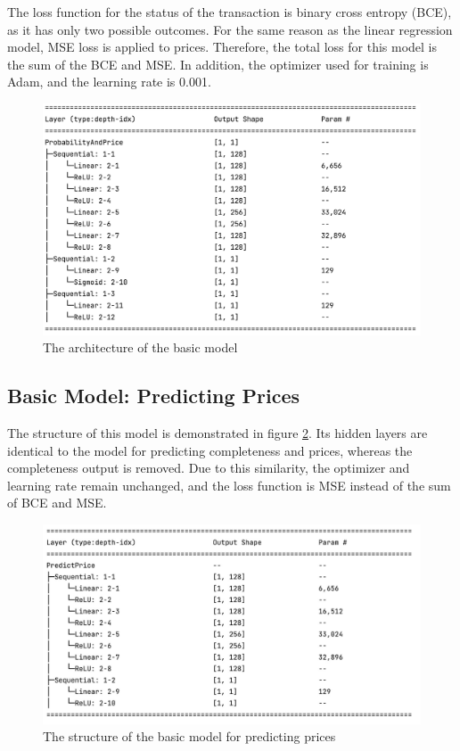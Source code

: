 \documentclass[12pt,twoside]{report}
\begin{document}
The loss function for the status of the transaction is binary cross entropy (BCE), as it has only two possible outcomes. For the same reason as the linear regression model, MSE loss is applied to prices. Therefore, the total loss for this model is the sum of the BCE and MSE. In addition, the optimizer used for training is Adam, and the learning rate is 0.001. 
\\ 

\begin{figure}[h]
	\centering
	\includegraphics[width=1\linewidth]{basic_model_layout}
	\caption{The architecture of the basic model}
	\label{basic_model_layout}
\end{figure}

\subsection{Basic Model: Predicting Prices}
\label{basic_model_price_all}
The structure of this model is demonstrated in figure \ref{basic_model_price}. Its hidden layers are identical to the model for predicting completeness and prices, whereas the completeness output is removed. Due to this similarity, the optimizer and learning rate remain unchanged, and the loss function is MSE instead of the sum of BCE and MSE. 

\begin{figure}[h]
	\centering
	\includegraphics[width=1\linewidth]{basic_model_price}
	\caption{The structure of the basic model for predicting prices}
	\label{basic_model_price}
\end{figure}
\end{document}
